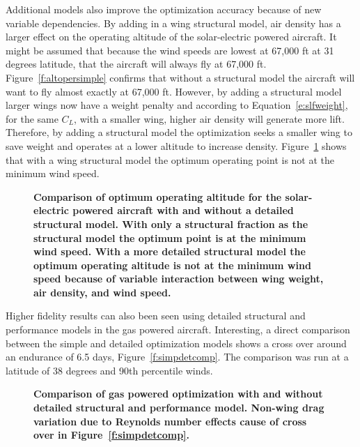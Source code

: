 \documentclass[]{aiaa-tc}%
\begin{document}
Additional models also improve the optimization accuracy because of new variable dependencies. 
By adding in a wing structural model, air density has a larger effect on the operating altitude of the solar-electric powered aircraft.  
It might be assumed that because the wind speeds are lowest at 67,000 ft at 31 degrees latitude, that the aircraft will always fly at 67,000 ft.  
Figure~\ref{f:altopersimple} confirms that without a structural model the aircraft will want to fly almost exactly at 67,000 ft.  
However, by adding a structural model larger wings now have a weight penalty and according to Equation~\eqref{e:slfweight}, for the same $C_L$, with a smaller wing, higher air density will generate more lift. 
Therefore, by adding a structural model the optimization seeks a smaller wing to save weight and operates at a lower altitude to increase density. 
Figure~\ref{f:altoper} shows that with a wing structural model the optimum operating point is not at the minimum wind speed. 

\begin{figure}[H]
 \begin{subfigmatrix}{2}%
 \end{subfigmatrix}
 \caption{\textbf{Comparison of optimum operating altitude for the solar-electric powered aircraft with and without a detailed structural model.  With only a structural fraction as the structural model the optimum point is at the minimum wind speed.  With a more detailed structural model the optimum operating altitude is not at the minimum wind speed because of variable interaction between wing weight, air density, and wind speed. }}
 \label{f:altoper}
\end{figure}

Higher fidelity results can also been seen using detailed structural and performance models in the gas powered aircraft. 
Interesting, a direct comparison between the simple and detailed optimization models shows a cross over around an endurance of 6.5 days, Figure~\ref{f:simpdetcomp}. The comparison was run at a latitude of 38 degrees and 90th percentile winds.

\begin{figure}[H]
 \begin{subfigmatrix}{2}%
 \end{subfigmatrix}
 \caption{\textbf{Comparison of gas powered optimization with and without detailed structural and performance model.  Non-wing drag variation due to Reynolds number effects cause of cross over in Figure~\ref{f:simpdetcomp}. }}
 \label{f:gasdetcomp}
\end{figure}
\end{document}
